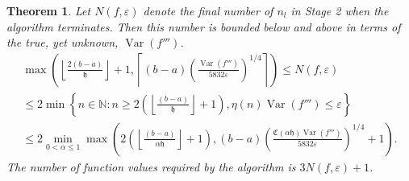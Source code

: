 \documentclass{iitthesis}
\DeclareMathOperator{\Var}{Var}
\newtheorem{theorem}{Theorem}
\theoremstyle{definition}
\theoremstyle{remark}
\begin{document}
\begin{theorem}\label{uppbndcost}
    Let $N(f,\varepsilon)$ denote the final number of $n_l$ in Stage 2 when the algorithm terminates. Then this number is bounded below and above in terms of the true, yet unknown, $\Var(f''')$.
    \begin{multline}\label{uppbndcostineq}
        \max\left(\left\lfloor\frac{2(b-a)}{\mathfrak{h}}\right\rfloor+1,\left\lceil(b-a)\left(\frac{\Var(f''')}{5832\varepsilon}\right)^{1/4}\right\rceil\right)\leq N(f,\varepsilon)\\ \leq 2\min\left\{n\in\mathbb{N}:n\geq2\left(\left\lfloor\frac{(b-a)}{\mathfrak{h}}\right\rfloor+1\right),\eta(n)\Var(f''')\leq\varepsilon\right\}\\ \leq 2\min_{0<\alpha\leq1}\max\left(2\left(\left\lfloor\frac{(b-a)}{\alpha\mathfrak{h}}\right\rfloor+1\right),(b-a)\left(\frac{\mathfrak{C}(\alpha\mathfrak{h})\Var(f''')}{5832\varepsilon}\right)^{1/4}+1\right).
    \end{multline}
    The number of function values required by the algorithm is $3N(f,\varepsilon)+1$.
\end{theorem}
\end{document}
